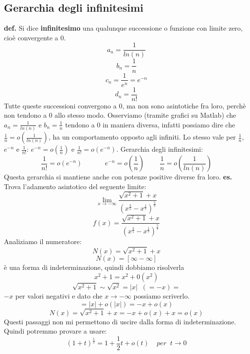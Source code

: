 \subsection*{Gerarchia degli infinitesimi}
\textbf{def.} Si dice \textbf{infinitesimo} una qualunque successione o funzione con limite zero, cioè convergente a $0$.
\newline
\newline
\[
    a_n = \frac{1}{ln(n)}
\]
\[
    b_n = \frac{1}{n}
\]
\[
    c_n = \frac{1}{e^n} = e ^{-n}
\]
\[
    d_n = \frac{1}{n!}
\]
Tutte queste successioni convergono a $0$, ma non sono asintotiche fra loro, perchè non tendono a $0$ allo stesso modo.
\newline
\newline
Osserviamo (tramite grafici su Matlab) che $a_n = \frac{1}{ln(n)}$ e $b_n = \frac{1}{n}$ tendono a $0$ in maniera diversa, infatti possiamo dire che $\frac{1}{n} = o(\frac{1}{ln(n)})$, ha un comportamento opposto agli infiniti.
\newline
Lo stesso vale per $\frac{1}{n}$, $e ^{-n}$ e $\frac{1}{n!}$: $e^{-n} = o(\frac{1}{n})$ e $\frac{1}{n!} = o(e^{-n})$.
\newline
\newline
Gerarchia degli infinitesimi:
\[
    \frac{1}{n!} = o(e^{-n}) \;\;\;\;\;\;\;\;\;\;\;\; e^{-n} = o(\frac{1}{n}) \;\;\;\;\;\;\;\; \frac{1}{n} = o(\frac{1}{ln(n)})
\]
Questa gerarchia si mantiene anche con potenze positive diverse fra loro.
\newline
\newline
\newline
\newline
\textbf{es.} Trova l'adamento asintotico del seguente limite:
\[
    \lim_{x\rightarrow -\infty} \frac{\sqrt{x^2+1}+x}{(x^{\frac{3}{5}}-x^{\frac{1}{7}})^{\frac{5}{7}}}
\]
\[
    f(x)= \frac{\sqrt{x^2+1}+x}{(x^{\frac{3}{5}}-x^{\frac{1}{7}})^{\frac{5}{7}}}
\]
Analiziamo il numeratore:
\[
    N(x) = \sqrt{x^2+1}+x
\]
\[
    N(x) = [\infty - \infty]
\]
è una forma di indeterminazione, quindi dobbiamo risolverla
\[
    x^2+1 = x^2+0(x^2)
\]
\[
    \sqrt{x^2+1} \sim \sqrt{x^2} = |x|\;\; (= -x) =
\]
$-x$ per valori negativi e dato che $x \rightarrow - \infty$ possiamo scriverlo.
\[
    = |x| + o(|x|) = -x + o(x)
\]
\[
    N(x) = \sqrt{x^2+1} +x = -x + o(x) + x = o(x)
\]
Questi passaggi non mi permettono di uscire dalla forma di indeterminazione.
\newline
Quindi potremmo provare a usare:
\[
    (1+t)^{\frac{1}{2}} = 1+ \frac{1}{2} t + o(t) \;\;\;\;per \;\; t \rightarrow 0
\]
